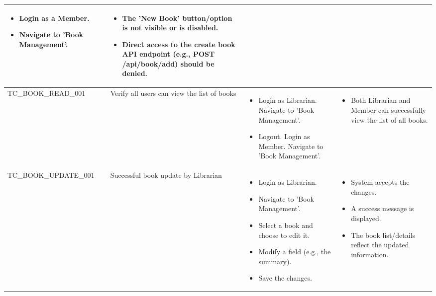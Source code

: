 \documentclass[10pt, a4paper]{report}
\begin{document}
\begin{longtable}{|>{\raggedright\arraybackslash}p{4.5cm}|>{\raggedright\arraybackslash}p{4cm}|>{\raggedright\arraybackslash}p{4.5cm}|>{\raggedright\arraybackslash}p{4cm}|}
\begin{itemize}[noitemsep, topsep=0pt, partopsep=0pt, leftmargin=*]
        \item Login as a Member.
        \item Navigate to 'Book Management'.
    \end{itemize} & 
    \begin{itemize}[noitemsep, topsep=0pt, partopsep=0pt, leftmargin=*]
        \item The 'New Book' button/option is not visible or is disabled.
        \item Direct access to the create book API endpoint (e.g., POST /api/book/add) should be denied.
    \end{itemize} \\ \hline
TC\_BOOK\_READ\_001 & Verify all users can view the list of books & 
    \begin{itemize}[noitemsep, topsep=0pt, partopsep=0pt, leftmargin=*]
        \item Login as Librarian. Navigate to 'Book Management'.
        \item Logout. Login as Member. Navigate to 'Book Management'.
    \end{itemize} & 
    \begin{itemize}[noitemsep, topsep=0pt, partopsep=0pt, leftmargin=*]
        \item Both Librarian and Member can successfully view the list of all books.
    \end{itemize} \\ \hline
TC\_BOOK\_UPDATE\_001 & Successful book update by Librarian & 
    \begin{itemize}[noitemsep, topsep=0pt, partopsep=0pt, leftmargin=*]
        \item Login as Librarian.
        \item Navigate to 'Book Management'.
        \item Select a book and choose to edit it.
        \item Modify a field (e.g., the summary).
        \item Save the changes.
    \end{itemize} & 
    \begin{itemize}[noitemsep, topsep=0pt, partopsep=0pt, leftmargin=*]
        \item System accepts the changes.
        \item A success message is displayed.
        \item The book list/details reflect the updated information.
    \end{itemize} \\ \hline

\end{longtable}
\end{document}
